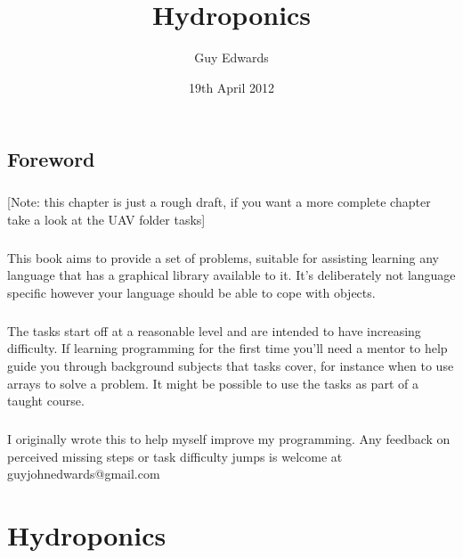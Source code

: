 \documentclass[11pt]{book}
\author{Guy Edwards}
\date{19th April 2012}
\title{Hydroponics}
\begin{document}
\maketitle

\section{Foreword}

\paragraph{} [Note: this chapter is just a rough draft, if you want a more complete chapter take a look at the UAV folder tasks]

\paragraph{} This book aims to provide a set of problems, suitable for assisting learning any language that has a graphical library available to it. It's deliberately not language specific however your language should be able to cope with objects.

\paragraph{} The tasks start off at a reasonable level and are intended to have increasing difficulty. If learning programming for the first time you'll need a mentor to help guide you through background subjects that tasks cover, for instance when to use arrays to solve a problem. It might be possible to use the tasks as part of a taught course.

\paragraph{} I originally wrote this to help myself improve my programming. Any feedback on perceived missing steps or task difficulty jumps is welcome at guyjohnedwards@gmail.com


\paragraph{}

\tableofcontents

\chapter{Hydroponics}
\end{document}
